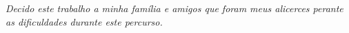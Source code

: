 \begin{dedicatoria}
   \vspace*{\fill}
   \noindent
   \textit{Decido este trabalho a minha família e amigos que foram meus alicerces perante as dificuldades durante este percurso.}
\end{dedicatoria}
